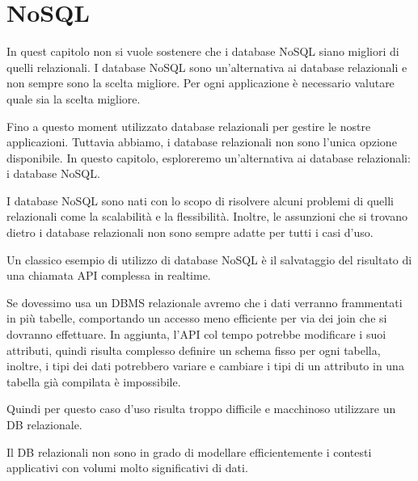 \chapter{NoSQL}

\begin{nota}
    In quest capitolo non si vuole sostenere che i database NoSQL siano
    migliori di quelli relazionali. I database NoSQL sono un'alternativa
    ai database relazionali e non sempre sono la scelta migliore. Per ogni
    applicazione è necessario valutare quale sia la scelta migliore.
\end{nota}

Fino a questo moment utilizzato database relazionali per gestire le
nostre applicazioni. Tuttavia abbiamo, i database relazionali non sono l'unica
opzione disponibile. In questo capitolo, esploreremo un'alternativa ai
database relazionali: i database NoSQL.

I database NoSQL sono nati con lo scopo di risolvere alcuni problemi di quelli
relazionali come la scalabilità e la flessibilità. Inoltre, le assunzioni che
si trovano dietro i database relazionali non sono sempre adatte per tutti i
casi d'uso.

\begin{esempio}
    Un classico esempio di utilizzo di database NoSQL è il salvataggio del risultato
    di una chiamata API complessa in realtime.
    
    Se dovessimo usa un DBMS relazionale avremo che i dati verranno frammentati 
    in più tabelle, comportando un accesso meno efficiente per via dei join che 
    si dovranno effettuare. In aggiunta, l'API col tempo potrebbe modificare i
    suoi attributi, quindi risulta complesso definire un schema fisso per ogni tabella,
    inoltre, i tipi dei dati potrebbero variare e cambiare i tipi di un attributo
    in una tabella già compilata è impossibile.

    Quindi per questo caso d'uso risulta troppo difficile e macchinoso utilizzare 
    un DB relazionale.
\end{esempio}

Il DB relazionali non sono in grado di modellare efficientemente i contesti applicativi
con volumi molto significativi di dati.


